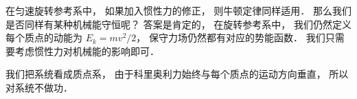 

在匀速旋转参考系中， 如果加入惯性力的修正， 则牛顿定律同样适用． 那么我们是否同样有某种机械能守恒呢？ 答案是肯定的， 在旋转参考系中， 我们仍然定义每个质点的动能为 $E_k = mv^2/2$， 保守力场仍然都有对应的势能函数． 我们只需要考虑惯性力对机械能的影响即可．

我们把系统看成质点系， 由于科里奥利力始终与每个质点的运动方向垂直， 所以对系统不做功．
